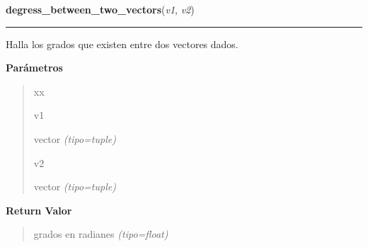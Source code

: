 \hspace{.8\funcindent}\begin{boxedminipage}{\funcwidth}

    \raggedright \textbf{degress\_between\_two\_vectors}(\textit{v1}, \textit{v2})

    \vspace{-1.5ex}

    \rule{\textwidth}{0.5\fboxrule}
\setlength{\parskip}{2ex}
Halla los grados que existen entre dos vectores dados.

\setlength{\parskip}{1ex}
      \textbf{Parámetros}
      \vspace{-1ex}

      \begin{quote}
        \begin{Ventry}{xx}

          \item[v1]


vector
            {\it (tipo=tuple)}

          \item[v2]


vector
            {\it (tipo=tuple)}

        \end{Ventry}

      \end{quote}

      \textbf{Return Valor}
    \vspace{-1ex}

      \begin{quote}

grados en radianes
      {\it (tipo=float)}

      \end{quote}

    \end{boxedminipage}

    \label{src:check_goban_moved:check_directions}

    \vspace{0.5ex}

